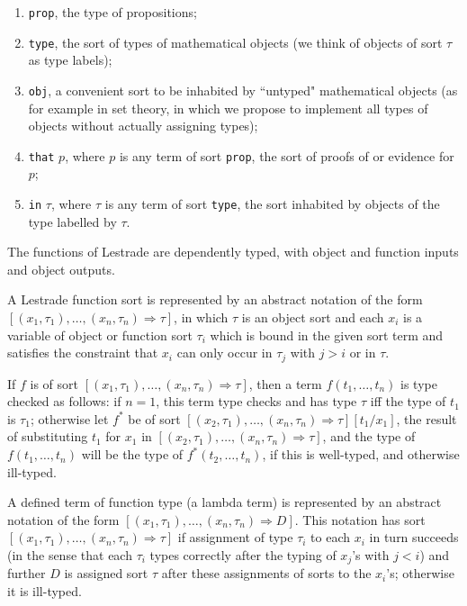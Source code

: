 \documentclass[12pt]{article}
\begin{document}
\begin{enumerate}

\item {\tt prop}, the type of propositions;

\item {\tt type}, the sort of types of mathematical objects (we think of objects of sort $\tau$  as type labels);

\item {\tt obj}, a convenient sort to be inhabited by ``untyped" mathematical objects (as for example in set theory, in which we propose to implement all types of objects without actually assigning types);

\item {\tt that} $p$, where $p$ is any term of sort {\tt prop}, the sort of proofs of or evidence for $p$;

\item {\tt in} $\tau$, where $\tau$ is any term of sort {\tt type}, the sort inhabited by objects of the type labelled by $\tau$.

\end{enumerate}

The functions of Lestrade are dependently typed, with object and function inputs and object outputs.

A Lestrade function sort is represented by an abstract notation of the form $[(x_1,\tau_1),\ldots,(x_n,\tau_n) \Rightarrow \tau]$, in which $\tau$ is an object sort and each $x_i$ is a variable of object or function sort $\tau_i$ which is bound in the given sort term and satisfies the constraint that $x_i$ can only occur in $\tau_j$ with $j>i$ or in $\tau$.

If $f$ is of sort $[(x_1,\tau_1),\ldots,(x_n,\tau_n) \Rightarrow \tau]$, then a term $f(t_1,\ldots,t_n)$ is type checked as follows: if $n=1$, this term type checks and has type $\tau$ iff the type
of $t_1$ is $\tau_1$;  otherwise let $f^*$ be of sort $[(x_2,\tau_1),\ldots,(x_n,\tau_n) \Rightarrow \tau][t_1/x_1]$, the result of substituting $t_1$ for $x_1$ in $[(x_2,\tau_1),\ldots,(x_n,\tau_n) \Rightarrow \tau]$, and the type of $f(t_1,\ldots,t_n)$ will be the type of $f^*(t_2,\ldots,t_n)$, if this is well-typed, and otherwise ill-typed.

A defined term of function type (a lambda term) is represented by an abstract notation of the form $[(x_1,\tau_1),\ldots,(x_n,\tau_n) \Rightarrow D]$.  This notation has sort $[(x_1,\tau_1),\ldots,(x_n,\tau_n) \Rightarrow \tau]$ if assignment of type $\tau_i$ to each $x_i$ in turn succeeds (in the sense that each $\tau_i$ types correctly after the typing of $x_j$'s with $j<i$) and further $D$ is assigned sort $\tau$ after these assignments of sorts to the $x_i$'s; otherwise it is ill-typed.
\end{document}
